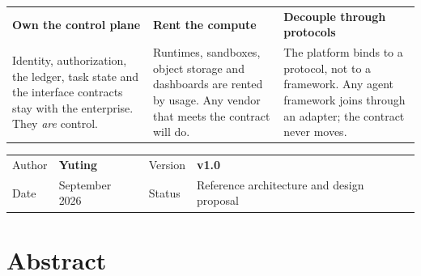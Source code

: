 \begin{titlepage}
  \vspace{1.4cm}

  \noindent
  \begin{tabularx}{\textwidth}{@{}YYY@{}}
    {\sffamily\bfseries\color{PrimaryDark}Own the control plane} &
    {\sffamily\bfseries\color{PrimaryDark}Rent the compute} &
    {\sffamily\bfseries\color{PrimaryDark}Decouple through protocols}\\[0.2em]
    {\small\color{BodyText}Identity, authorization, the ledger, task state and the interface contracts stay with the enterprise. They \emph{are} control.} &
    {\small\color{BodyText}Runtimes, sandboxes, object storage and dashboards are rented by usage. Any vendor that meets the contract will do.} &
    {\small\color{BodyText}The platform binds to a protocol, not to a framework. Any agent framework joins through an adapter; the contract never moves.}
  \end{tabularx}

  \vfill

  \noindent{\color{Rule}\rule{\textwidth}{0.6pt}}\par
  \vspace{0.55cm}
  \noindent
  \begin{tabularx}{\textwidth}{@{}L{2.4cm}L{6.2cm}L{2.4cm}Y@{}}
    {\sffamily\small\color{Muted}Author} & {\sffamily\bfseries\color{Ink}Yuting} &
    {\sffamily\small\color{Muted}Version} & {\sffamily\bfseries\color{Ink}v1.0}\\[0.35em]
    {\sffamily\small\color{Muted}Date} & {\sffamily\color{Ink}September 2026} &
    {\sffamily\small\color{Muted}Status} & {\sffamily\color{Ink}Reference architecture and design proposal}
  \end{tabularx}
  \vspace{0.45cm}

\end{titlepage}

\hypersetup{pageanchor=true}

\section*{Abstract}

